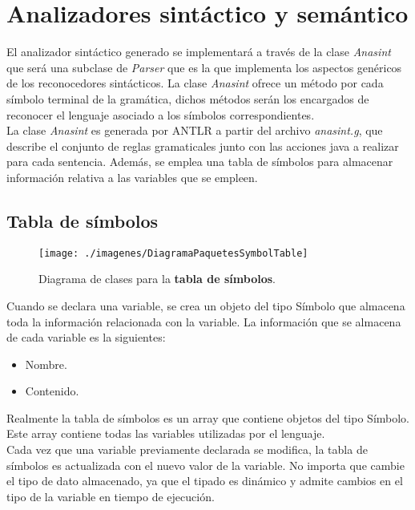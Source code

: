 \chapter{Analizadores sintáctico y semántico}
El analizador sintáctico generado se implementará a través de la clase \textit{Anasint} que será una subclase de \textit{Parser}
que es la que implementa los aspectos genéricos de los reconocedores sintácticos. La clase \textit{Anasint} ofrece un método por cada
símbolo terminal de la gramática, dichos métodos serán los encargados de reconocer el lenguaje asociado a los símbolos correspondientes.\\

La clase \textit{Anasint} es generada por ANTLR a partir del archivo \textit{anasint.g}, que describe el conjunto de reglas gramaticales junto con las acciones java a realizar para cada sentencia. Además, se emplea una tabla de símbolos para almacenar información relativa a las variables que se empleen. 

   \section{Tabla de símbolos}

   \begin{figure} [H] \begin{center}
   \texttt{[image: ./imagenes/DiagramaPaquetesSymbolTable]}\label{paqueteSymbolTable}
   \caption{Diagrama de clases para la \textbf{tabla de símbolos}.}
   \end{center} \end{figure}

   Cuando se declara una variable, se crea un objeto del tipo Símbolo que almacena toda la información relacionada con la variable. La 
   información que se almacena de cada variable es la siguientes: 
   \begin{itemize}
      \item Nombre.
      \item Contenido.\\
   \end{itemize}
   Realmente la tabla de símbolos es un array que contiene objetos del tipo Símbolo. Este array contiene todas las variables utilizadas 
   por el lenguaje.\\

   Cada vez que una variable previamente declarada se modifica, la tabla de símbolos es actualizada con el nuevo valor de la variable. No
   importa que cambie el tipo de dato almacenado, ya que el tipado es dinámico y admite cambios en el tipo de la variable en tiempo de ejecución.\\

